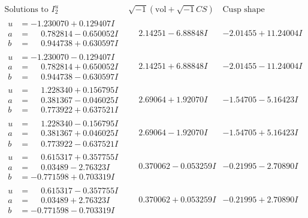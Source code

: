 \documentclass[1p]{elsarticle_modified}
\theoremstyle{definition}
\newcommand{\I}{\sqrt{-1}}
\begin{document}
$$\begin{array}{c|c|c}  
\text{Solutions to }I^u_{2}& \I (\text{vol} + \sqrt{-1}CS) & \text{Cusp shape}\\
 \hline 
\begin{aligned}
u &= -1.230070 + 0.129407 I \\
a &= \phantom{-}0.782814 - 0.650052 I \\
b &= \phantom{-}0.944738 + 0.630597 I\end{aligned}
 & \phantom{-}2.14251 - 6.88848 I & -2.01455 + 11.24004 I \\ \hline\begin{aligned}
u &= -1.230070 - 0.129407 I \\
a &= \phantom{-}0.782814 + 0.650052 I \\
b &= \phantom{-}0.944738 - 0.630597 I\end{aligned}
 & \phantom{-}2.14251 + 6.88848 I & -2.01455 - 11.24004 I \\ \hline\begin{aligned}
u &= \phantom{-}1.228340 + 0.156795 I \\
a &= \phantom{-}0.381367 - 0.046025 I \\
b &= \phantom{-}0.773922 + 0.637521 I\end{aligned}
 & \phantom{-}2.69064 + 1.92070 I & -1.54705 - 5.16423 I \\ \hline\begin{aligned}
u &= \phantom{-}1.228340 - 0.156795 I \\
a &= \phantom{-}0.381367 + 0.046025 I \\
b &= \phantom{-}0.773922 - 0.637521 I\end{aligned}
 & \phantom{-}2.69064 - 1.92070 I & -1.54705 + 5.16423 I \\ \hline\begin{aligned}
u &= \phantom{-}0.615317 + 0.357755 I \\
a &= \phantom{-}0.03489 - 2.76323 I \\
b &= -0.771598 + 0.703319 I\end{aligned}
 & \phantom{-}0.370062 - 0.053259 I & -0.21995 - 2.70890 I \\ \hline\begin{aligned}
u &= \phantom{-}0.615317 - 0.357755 I \\
a &= \phantom{-}0.03489 + 2.76323 I \\
b &= -0.771598 - 0.703319 I\end{aligned}
 & \phantom{-}0.370062 + 0.053259 I & -0.21995 + 2.70890 I \\ \hline\begin{aligned}

\end{aligned}
\end{array}$$
\end{document}
